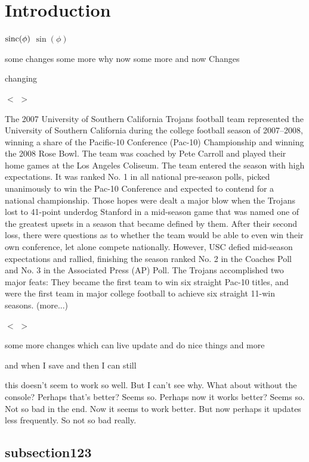
\section[Intro]{Introduction}
\label{sec:intro}

${\rm sinc}(\phi)$ 
$\sin(\phi)$  

some changes some more why now some more and now
Changes

changing

$<$ $>$

The 2007 University of Southern California Trojans football team represented the
University of Southern California during the college football season of
2007–2008, winning a share of the Pacific-10 Conference (Pac-10) Championship
and winning the 2008 Rose Bowl. The team was coached by Pete Carroll and played
their home games at the Los Angeles Coliseum. The team entered the season with
high expectations. It was ranked No. 1 in all national pre-season polls, picked
unanimously to win the Pac-10 Conference and expected to contend for a national
championship. Those hopes were dealt a major blow when the Trojans lost to
41-point underdog Stanford in a mid-season game that was named one of the
greatest upsets in a season that became defined by them. After their second
loss, there were questions as to whether the team would be able to even win
their own conference, let alone compete nationally. However, USC defied
mid-season expectations and rallied, finishing the season ranked No. 2 in the
Coaches Poll and No. 3 in the Associated Press (AP) Poll. The Trojans
accomplished two major feats: They became the first team to win six straight
Pac-10 titles, and were the first team in major college football to achieve six
straight 11-win seasons. (more...)


$<$ $>$


some more changes which can live update and do nice things and more

and when I save and  then I can still  

this doesn't seem to work so well. But I can't see why. What about without the
console? Perhaps that's better? Seems so. Perhaps now it works better? Seems so.
Not so bad in the end. Now it seems to work better. But now perhaps it updates
less frequently. So not so bad really.

\subsection*{subsection123}
  
